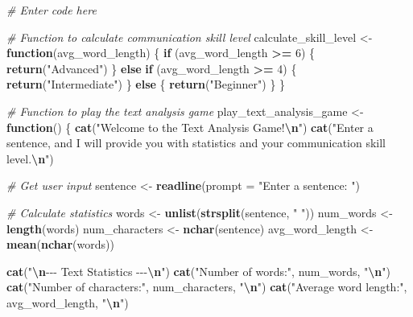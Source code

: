 \documentclass[
]{article}
\newenvironment{Shaded}{\begin{snugshade}}{\end{snugshade}}
\newcommand{\AttributeTok}[1]{\textcolor[rgb]{0.13,0.29,0.53}{#1}}
\newcommand{\CommentTok}[1]{\textcolor[rgb]{0.56,0.35,0.01}{\textit{#1}}}
\newcommand{\ControlFlowTok}[1]{\textcolor[rgb]{0.13,0.29,0.53}{\textbf{#1}}}
\newcommand{\DecValTok}[1]{\textcolor[rgb]{0.00,0.00,0.81}{#1}}
\newcommand{\FunctionTok}[1]{\textcolor[rgb]{0.13,0.29,0.53}{\textbf{#1}}}
\newcommand{\NormalTok}[1]{#1}
\newcommand{\OtherTok}[1]{\textcolor[rgb]{0.56,0.35,0.01}{#1}}
\newcommand{\SpecialCharTok}[1]{\textcolor[rgb]{0.81,0.36,0.00}{\textbf{#1}}}
\newcommand{\StringTok}[1]{\textcolor[rgb]{0.31,0.60,0.02}{#1}}
\begin{document}
\begin{Shaded}
\begin{Highlighting}[]
\CommentTok{\# Enter code here}

\CommentTok{\# Function to calculate communication skill level}
\NormalTok{calculate\_skill\_level }\OtherTok{\textless{}{-}} \ControlFlowTok{function}\NormalTok{(avg\_word\_length) \{}
  \ControlFlowTok{if}\NormalTok{ (avg\_word\_length }\SpecialCharTok{\textgreater{}=} \DecValTok{6}\NormalTok{) \{}
    \FunctionTok{return}\NormalTok{(}\StringTok{"Advanced"}\NormalTok{)}
\NormalTok{  \} }\ControlFlowTok{else} \ControlFlowTok{if}\NormalTok{ (avg\_word\_length }\SpecialCharTok{\textgreater{}=} \DecValTok{4}\NormalTok{) \{}
    \FunctionTok{return}\NormalTok{(}\StringTok{"Intermediate"}\NormalTok{)}
\NormalTok{  \} }\ControlFlowTok{else}\NormalTok{ \{}
    \FunctionTok{return}\NormalTok{(}\StringTok{"Beginner"}\NormalTok{)}
\NormalTok{  \}}
\NormalTok{\}}

\CommentTok{\# Function to play the text analysis game}
\NormalTok{play\_text\_analysis\_game }\OtherTok{\textless{}{-}} \ControlFlowTok{function}\NormalTok{() \{}
  \FunctionTok{cat}\NormalTok{(}\StringTok{"Welcome to the Text Analysis Game!}\SpecialCharTok{\textbackslash{}n}\StringTok{"}\NormalTok{)}
  \FunctionTok{cat}\NormalTok{(}\StringTok{"Enter a sentence, and I will provide you with statistics and your communication skill level.}\SpecialCharTok{\textbackslash{}n}\StringTok{"}\NormalTok{)}
  
  \CommentTok{\# Get user input}
\NormalTok{  sentence }\OtherTok{\textless{}{-}} \FunctionTok{readline}\NormalTok{(}\AttributeTok{prompt =} \StringTok{"Enter a sentence: "}\NormalTok{)}
  
  \CommentTok{\# Calculate statistics}
\NormalTok{  words }\OtherTok{\textless{}{-}} \FunctionTok{unlist}\NormalTok{(}\FunctionTok{strsplit}\NormalTok{(sentence, }\StringTok{" "}\NormalTok{))}
\NormalTok{  num\_words }\OtherTok{\textless{}{-}} \FunctionTok{length}\NormalTok{(words)}
\NormalTok{  num\_characters }\OtherTok{\textless{}{-}} \FunctionTok{nchar}\NormalTok{(sentence)}
\NormalTok{  avg\_word\_length }\OtherTok{\textless{}{-}} \FunctionTok{mean}\NormalTok{(}\FunctionTok{nchar}\NormalTok{(words))}
  
  \FunctionTok{cat}\NormalTok{(}\StringTok{"}\SpecialCharTok{\textbackslash{}n}\StringTok{{-}{-}{-} Text Statistics {-}{-}{-}}\SpecialCharTok{\textbackslash{}n}\StringTok{"}\NormalTok{)}
  \FunctionTok{cat}\NormalTok{(}\StringTok{"Number of words:"}\NormalTok{, num\_words, }\StringTok{"}\SpecialCharTok{\textbackslash{}n}\StringTok{"}\NormalTok{)}
  \FunctionTok{cat}\NormalTok{(}\StringTok{"Number of characters:"}\NormalTok{, num\_characters, }\StringTok{"}\SpecialCharTok{\textbackslash{}n}\StringTok{"}\NormalTok{)}
  \FunctionTok{cat}\NormalTok{(}\StringTok{"Average word length:"}\NormalTok{, avg\_word\_length, }\StringTok{"}\SpecialCharTok{\textbackslash{}n}\StringTok{"}\NormalTok{)}
  

\end{Highlighting}
\end{Shaded}
\end{document}
